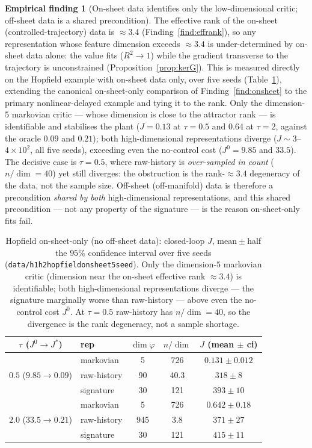 \documentclass[11pt]{article}
\renewcommand{\_}{\discretionary{\textunderscore}{}{\textunderscore}}
\theoremstyle{plain}
\theoremstyle{definition}
\newtheorem{finding}[theorem]{Empirical finding}
\begin{document}
\begin{finding}[On-sheet data identifies only the low-dimensional critic; off-sheet data is a shared precondition]\label{find:onsheet-shared}
The effective rank of the on-sheet (controlled-trajectory) data is $\approx3.4$
(Finding~\ref{find:effrank}), so any representation whose feature dimension exceeds $\approx3.4$ is
under-determined by on-sheet data alone: the value fits ($R^{2}\to1$) while the gradient transverse
to the trajectory is unconstrained (Proposition~\ref{prop:kerG}). This is measured directly on the
Hopfield example with on-sheet data only, over five seeds (Table~\ref{tab:onsheet}), extending the
canonical on-sheet-only comparison of Finding~\ref{find:onsheet} to the primary nonlinear-delayed
example and tying it to the rank. Only the dimension-$5$ markovian critic --- whose dimension is
close to the attractor rank --- is identifiable and stabilises the plant ($J=0.13$ at $\tau=0.5$
and $0.64$ at $\tau=2$, against the oracle $0.09$ and $0.21$); both high-dimensional
representations diverge ($J\sim3$--$4\times10^{2}$, all five seeds), exceeding even the no-control
cost ($J^{0}=9.85$ and $33.5$). The decisive case is $\tau=0.5$, where raw-history is
\emph{over-sampled in count} ($n/\dim=40$) yet still diverges: the obstruction is the
rank-$\approx3.4$ degeneracy of the data, not the sample size. Off-sheet (off-manifold) data is
therefore a precondition \emph{shared by both} high-dimensional representations, and this shared
precondition --- not any property of the signature --- is the reason on-sheet-only fits fail.
\end{finding}

\begin{table}[ht]\centering\small
\caption{Hopfield on-sheet-only (no off-sheet data): closed-loop $J$, mean${}\pm{}$half the $95\%$
confidence interval over five seeds (\texttt{data/h1h2\_hopfield\_onsheet\_5seed}). Only the
dimension-$5$ markovian critic (dimension near the on-sheet effective rank $\approx3.4$) is
identifiable; both high-dimensional representations diverge --- the signature marginally worse than
raw-history --- above even the no-control cost $J^{0}$. At $\tau=0.5$ raw-history has $n/\dim=40$,
so the divergence is the rank degeneracy, not a sample shortage.}\label{tab:onsheet}
\setlength{\tabcolsep}{6pt}
\begin{tabular}{cl ccc}
\toprule
$\tau$ ($J^{0}\!\to\! J^{\ast}$) & rep & $\dim\varphi$ & $n/\dim$ & $J$ (mean $\pm$ ci)\\
\midrule
\multirow{3}{*}{$0.5$ ($9.85\!\to\!0.09$)}
 & markovian   & 5  & 726  & $\mathbf{0.131\pm0.012}$\\
 & raw-history & 90 & 40.3 & $318\pm8$\\
 & signature   & 30 & 121  & $393\pm10$\\
\midrule
\multirow{3}{*}{$2.0$ ($33.5\!\to\!0.21$)}
 & markovian   & 5   & 726 & $\mathbf{0.642\pm0.18}$\\
 & raw-history & 945 & 3.8 & $371\pm27$\\
 & signature   & 30  & 121 & $415\pm11$\\
\bottomrule
\end{tabular}
\end{table}
\end{document}
